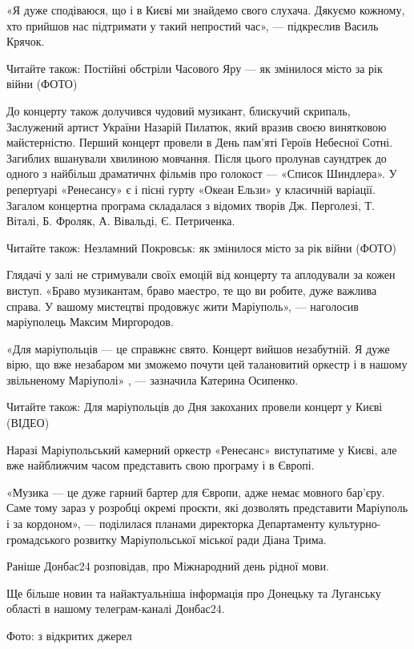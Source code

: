 «Я дуже сподіваюся, що і в Києві ми знайдемо свого слухача. Дякуємо кожному,
хто прийшов нас підтримати у такий непростий час», — підкреслив Василь Крячок.

Читайте також: Постійні обстріли Часового Яру — як змінилося місто за рік війни
(ФОТО)

До концерту також долучився чудовий музикант, блискучий скрипаль, Заслужений
артист України Назарій Пилатюк, який вразив своєю винятковою майстерністю.
Перший концерт провели в День пам’яті Героїв Небесної Сотні. Загиблих вшанували
хвилиною мовчання. Після цього пролунав саундтрек до одного з найбільш
драматичнх фільмів про голокост — «Список Шиндлера». У репертуарі «Ренесансу» є
і пісні гурту «Океан Ельзи» у класичній варіації. Загалом концертна програма
складалася з відомих творів Дж. Перголезі, Т. Віталі, Б. Фроляк, А. Вівальді,
Є. Петриченка.

Читайте також: Незламний Покровськ: як змінилося місто за рік війни (ФОТО)

Глядачі у залі не стримували своїх емоцій від концерту та аплодували за кожен
виступ.  «Браво музикантам, браво маестро, те що ви робите, дуже важлива
справа. У вашому мистецтві продовжує жити Маріуполь», — наголосив маріуполець
Максим Миргородов.

«Для маріупольців — це справжнє свято. Концерт вийшов незабутній. Я дуже вірю,
що вже незабаром ми зможемо почути цей талановитий оркестр і в нашому
звільненому Маріуполі» , — зазначила Катерина Осипенко.

Читайте також: Для маріупольців до Дня закоханих провели концерт у Києві
(ВІДЕО)

Наразі Маріупольський камерний оркестр «Ренесанс» виступатиме у Києві, але вже
найближчим часом представить свою програму і в Європі.

«Музика — це дуже гарний бартер для Європи, адже немає мовного бар'єру. Саме
тому зараз у розробці окремі проєкти, які дозволять представити Маріуполь і за
кордоном», — поділилася планами директорка Департаменту культурно-громадського
розвитку Маріупольської міської ради Діана Трима.

Раніше Донбас24 розповідав, про Міжнародний день рідної мови.

Ще більше новин та найактуальніша інформація про Донецьку та Луганську області
в нашому телеграм-каналі Донбас24.

Фото: з відкритих джерел
